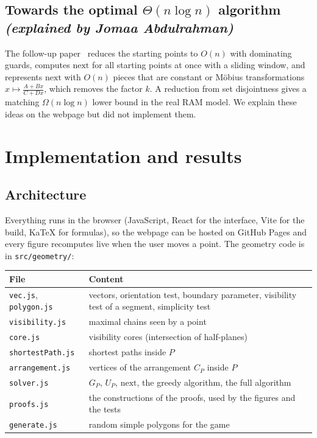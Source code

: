 \documentclass[11pt,a4paper]{article}
\theoremstyle{definition}
\theoremstyle{remark}
\newcommand{\nextop}{\mathrm{next}}
\newcommand{\by}[1]{\hfill{\small\textit{(explained by #1)}}}
\begin{document}
\subsection[\texorpdfstring{Towards the optimal $\Theta(n\log n)$ algorithm}{Towards the optimal Theta(n log n) algorithm}]{Towards the optimal $\Theta(n\log n)$ algorithm \by{Jomaa Abdulrahman}}
\label{sec:optimal}

The follow-up paper~\cite{deBerg2026} reduces the starting points to $O(n)$ with dominating guards, computes $\nextop$ for all starting points at once with a
sliding window, and represents $\nextop$ with $O(n)$ pieces that are constant or M\"obius transformations $x\mapsto\frac{A+Bx}{C+Dx}$, which removes the factor $k$.
A reduction from set disjointness gives a matching $\Omega(n\log n)$ lower bound in the real RAM model. We explain these ideas on the webpage but did not implement them.

\section{Implementation and results}
\label{sec:impl}

\subsection{Architecture}

Everything runs in the browser (JavaScript, React for the interface, Vite for the build, KaTeX for formulas), so the webpage can be hosted on GitHub Pages and
every figure recomputes live when the user moves a point. The geometry code is in \texttt{src/geometry/}:

\begin{center}
\begin{tabularx}{\linewidth}{@{}l Y@{}}
\toprule
File & Content \\
\midrule
\texttt{vec.js}, \texttt{polygon.js} & vectors, orientation test, boundary parameter, visibility test of a segment, simplicity test \\
\texttt{visibility.js} & maximal chains seen by a point \\
\texttt{core.js} & visibility cores (intersection of half-planes) \\
\texttt{shortestPath.js} & shortest paths inside $P$ \\
\texttt{arrangement.js} & vertices of the arrangement $C_P$ inside $P$ \\
\texttt{solver.js} & $G_P$, $U_P$, $\nextop$, the greedy algorithm, the full algorithm \\
\texttt{proofs.js} & the constructions of the proofs, used by the figures and the tests \\
\texttt{generate.js} & random simple polygons for the game \\
\bottomrule
\end{tabularx}
\end{center}
\end{document}

